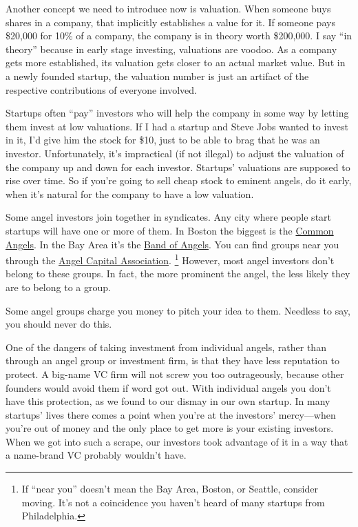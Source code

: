 \documentclass[12pt]{book}
\begin{document}
Another concept we need to introduce now is valuation. When someone buys
shares in a company, that implicitly establishes a value for it. If
someone pays \$20,000 for 10\% of a company, the company is in theory
worth \$200,000. I say ``in theory'' because in early stage investing,
valuations are voodoo. As a company gets more established, its valuation
gets closer to an actual market value. But in a newly founded startup,
the valuation number is just an artifact of the respective contributions
of everyone involved.

Startups often ``pay'' investors who will help the company in some way
by letting them invest at low valuations. If I had a startup and Steve
Jobs wanted to invest in it, I'd give him the stock for \$10, just to be
able to brag that he was an investor. Unfortunately, it's impractical
(if not illegal) to adjust the valuation of the company up and down for
each investor. Startups' valuations are supposed to rise over time. So
if you're going to sell cheap stock to eminent angels, do it early, when
it's natural for the company to have a low valuation.

Some angel investors join together in syndicates. Any city where people
start startups will have one or more of them. In Boston the biggest is
the \href{http://commonangels.com/home.html}{Common Angels}. In the Bay
Area it's the \href{http://bandangels.com/}{Band of Angels}. You can
find groups near you through the
\href{http://angelcapitalassociation.org/}{Angel Capital Association}.
\footnote{If ``near you'' doesn't mean the Bay Area, Boston, or Seattle,
consider moving. It's not a coincidence you haven't heard of many
startups from Philadelphia.} However, most angel investors don't belong to
these groups. In fact, the more prominent the angel, the less likely
they are to belong to a group.

Some angel groups charge you money to pitch your idea to them. Needless
to say, you should never do this.

One of the dangers of taking investment from individual angels, rather
than through an angel group or investment firm, is that they have less
reputation to protect. A big-name VC firm will not screw you too
outrageously, because other founders would avoid them if word got out.
With individual angels you don't have this protection, as we found to
our dismay in our own startup. In many startups' lives there comes a
point when you're at the investors' mercy---when you're out of money and
the only place to get more is your existing investors. When we got into
such a scrape, our investors took advantage of it in a way that a
name-brand VC probably wouldn't have.
\end{document}
